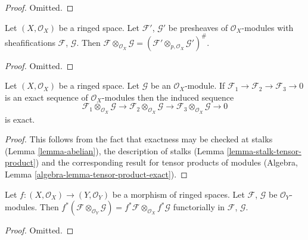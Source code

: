 \begin{proof}
Omitted.
\end{proof}

\begin{lemma}
\label{lemma-tensor-product-sheafification}
Let $(X, \mathcal{O}_X)$ be a ringed space.
Let $\mathcal{F}'$, $\mathcal{G}'$ be presheaves of $\mathcal{O}_X$-modules
with sheafifications $\mathcal{F}$, $\mathcal{G}$. Then
$\mathcal{F} \otimes_{\mathcal{O}_X} \mathcal{G} =
(\mathcal{F}' \otimes_{p, \mathcal{O}_X} \mathcal{G}')^\#$.
\end{lemma}

\begin{proof}
Omitted.
\end{proof}


\begin{lemma}
\label{lemma-tensor-product-exact}
\begin{reference}
\cite[Chapter I, \S 1, no. 10, pp. 205--206]{FAC}
\end{reference}
Let $(X, \mathcal{O}_X)$ be a ringed space.
Let $\mathcal{G}$ be an $\mathcal{O}_X$-module.
If
$\mathcal{F}_1
\to \mathcal{F}_2
\to \mathcal{F}_3
\to 0$
is an exact sequence of $\mathcal{O}_X$-modules then
the induced sequence
$$
\mathcal{F}_1 \otimes_{\mathcal{O}_X} \mathcal{G} \to
\mathcal{F}_2 \otimes_{\mathcal{O}_X} \mathcal{G} \to
\mathcal{F}_3 \otimes_{\mathcal{O}_X} \mathcal{G} \to
0
$$
is exact.
\end{lemma}

\begin{proof}
This follows from the fact that exactness may be checked at stalks
(Lemma \ref{lemma-abelian}), the description of stalks
(Lemma \ref{lemma-stalk-tensor-product}) and the corresponding
result for tensor products of modules
(Algebra, Lemma \ref{algebra-lemma-tensor-product-exact}).
\end{proof}

\begin{lemma}
\label{lemma-tensor-product-pullback}
Let $f : (X, \mathcal{O}_X) \to (Y, \mathcal{O}_Y)$ be
a morphism of ringed spaces. Let $\mathcal{F}$, $\mathcal{G}$
be $\mathcal{O}_Y$-modules. Then
$f^*(\mathcal{F} \otimes_{\mathcal{O}_Y} \mathcal{G})
= f^*\mathcal{F} \otimes_{\mathcal{O}_X} f^*\mathcal{G}$
functorially in $\mathcal{F}$, $\mathcal{G}$.
\end{lemma}

\begin{proof}
Omitted.
\end{proof}

